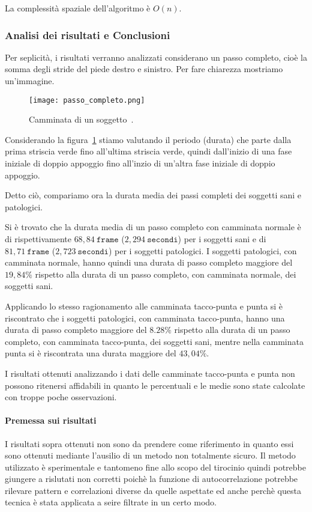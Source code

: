 La complessità spaziale dell'algoritmo è $O(n)$.


\subsubsection{Analisi dei risultati e Conclusioni}
Per seplicità, i risultati verranno analizzati considerano un passo completo, cioè la somma degli stride
del piede destro e sinistro. Per fare chiarezza mostriamo un'immagine.
\begin{figure}[H]
    \centering
    \texttt{[image: passo\_completo.png]}
    \caption{Camminata di un soggetto~\cite{cf:passo_completo}.}
    \label{fig:passo_completo}
\end{figure}
Considerando la figura~\ref*{fig:passo_completo} stiamo valutando il periodo (durata) che parte dalla prima striscia
verde fino all'ultima striscia verde, quindi dall'inizio di una fase iniziale di doppio appoggio fino all'inzio
di un'altra fase iniziale di doppio appoggio.

\begin{sloppypar}
Detto ciò, compariamo ora la durata media dei passi completi dei soggetti sani e patologici. 

Si è trovato che la durata media di un passo completo con camminata normale è di rispettivamente $68,84 \ \texttt{frame}$
($2,294 \ \texttt{secondi}$) per i soggetti sani e di 
$81,71 \ \texttt{frame}$ ($2,723 \ \texttt{secondi}$) per i soggetti patologici.
I soggetti patologici, con camminata normale, hanno quindi una durata di passo completo maggiore del 
$19,84\%$ rispetto alla durata di un passo completo, con camminata normale, dei soggetti sani.
\end{sloppypar}

Applicando lo stesso ragionamento alle camminata tacco-punta e punta si è riscontrato che 
i soggetti patologici, con camminata tacco-punta, hanno una durata di passo completo maggiore del 
$8.28\%$ rispetto alla durata di un passo completo, con camminata tacco-punta, dei soggetti sani, 
mentre nella camminata punta si è riscontrata una durata maggiore del $43,04\%$.

I risultati ottenuti analizzando i dati delle camminate tacco-punta e punta non possono ritenersi affidabili
in quanto le percentuali e le medie sono state calcolate con troppe poche osservazioni.


\paragraph*{Premessa sui risultati}
I risultati sopra ottenuti non sono da prendere come riferimento in quanto essi sono ottenuti
mediante l'ausilio di un metodo non totalmente sicuro. Il metodo utilizzato è sperimentale e tantomeno 
fine allo scopo del tirocinio quindi potrebbe giungere a rislutati non corretti 
poichè la funzione di autocorrelazione potrebbe rilevare pattern e correlazioni diverse da quelle
aspettate ed anche perchè questa tecnica è stata applicata a seire filtrate in un certo modo.



